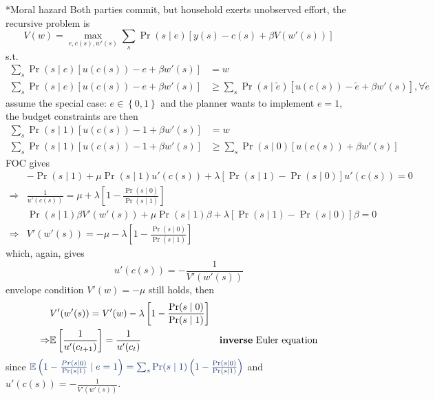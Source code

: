 \documentclass[10pt,landscape,a4paper]{article}
\makeatletter
\renewcommand{\subsubsection}{\@startsection{subsubsection}{1}{0mm}{.2ex}{.2ex}{\bfseries}}
\makeatother
\begin{document}
\begin{multicols*}{3}
\subsubsection*{Moral hazard}
Both parties commit, but household exerts unobserved effort, the recursive problem is
$$
V(w) = \max_{e, c(s),w'(s)}\sum_s \Pr(s\mid e) \left[ y(s)-c(s) + \beta V(w'(s)) \right]
$$
s.t.
\begin{align*}
    \sum_s \Pr(s\mid e)\left[ u(c(s))-e+\beta w'(s) \right] &= w \\
    \sum_s \Pr(s\mid e)\left[ u(c(s))-e+\beta w'(s) \right] &\geq \sum_s \Pr(s\mid \tilde{e})\left[ u(c(s))-\tilde{e}+\beta w'(s) \right], \forall \tilde{e}
\end{align*}
assume the special case: $e\in\left\{0,1\right\}$ and the planner wants to implement $e=1$, the budget constraints are then
\begin{align*}
    \sum_s \Pr(s\mid 1)\left[ u(c(s))-1+\beta w'(s) \right] &= w \\
    \sum_s \Pr(s\mid 1)\left[ u(c(s))-1+\beta w'(s) \right] &\geq \sum_s \Pr(s\mid 0)\left[ u(c(s))+\beta w'(s) \right]
\end{align*}
FOC gives
\begin{align*}
   & -\Pr(s\mid 1) + \mu\Pr(s\mid 1)u'(c(s)) + \lambda \left[ \Pr(s\mid 1)-\Pr(s\mid 0) \right]u'(c(s))= 0 \\
   \Rightarrow &  \frac{1}{u'(c(s))} = \mu + \lambda\left[ 1-\frac{\Pr(s\mid 0)}{\Pr(s\mid 1)} \right]\\
    & \Pr(s\mid 1)\beta V'(w'(s)) + \mu\Pr(s\mid 1)\beta + \lambda \left[ \Pr(s\mid 1)-\Pr(s\mid 0) \right]\beta= 0 \\
   \Rightarrow & V'(w'(s)) = -\mu - \lambda\left[ 1-\frac{\Pr(s\mid 0)}{\Pr(s\mid 1)} \right]
\end{align*}
which, again, gives
{\color{myred}$$
u'(c(s)) = -\frac{1}{V'(w'(s))}
$$}
envelope condition $V'(w)=-\mu$ still holds, then
\begin{align*}
    & V'(w'(s)) = V'(w) - \lambda\left[ 1-\frac{\Pr(s\mid 0)}{\Pr(s\mid 1)} \right] \\
    \Rightarrow& \mathbb{E}\left[\frac{1}{u'(c_{t+1})}\right] = \frac{1}{u'(c_t)} & \text{\textbf{inverse} Euler equation}
\end{align*}
since
${\color{myblue} \mathbb{E}\left(1-\frac{Pr(s\mid 0)}{\Pr(s\mid 1)}\mid e=1\right)=\sum_s\Pr(s\mid 1)\left(1-\frac{\Pr(s\mid 0)}{\Pr(s\mid 1)}\right)}$ and $u'(c(s))=-\frac{1}{V'(w'(s))}$.


\end{multicols*}
\end{document}
